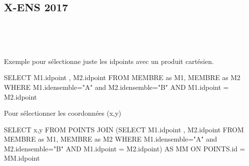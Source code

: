 \documentclass[10pt,fleqn]{article} %
\begin{document}
\begin{multicols}{2}
\subsection*{X-ENS 2017}
\setcounter{exo}{0}

\subparagraph{}~\\
\subparagraph{}~\\

Exemple pour sélectionne juste les idpoints avec un produit cartésien. 
\begin{sql}
SELECT  M1.idpoint , M2.idpoint 
	FROM MEMBRE as M1, MEMBRE as M2 
	WHERE M1.idensemble="A" and M2.idensemble="B" AND  M1.idpoint = M2.idpoint 
\end{sql}

Pour sélectionner les coordonnées (x,y)
\begin{sql}
SELECT x,y FROM 
	POINTS JOIN 
	(SELECT  M1.idpoint , M2.idpoint 
	FROM MEMBRE as M1, MEMBRE as M2 
	WHERE M1.idensemble="A" and M2.idensemble="B" AND  M1.idpoint = M2.idpoint) AS MM
	ON POINTS.id = MM.idpoint
\end{sql}




\end{multicols}
\end{document}
